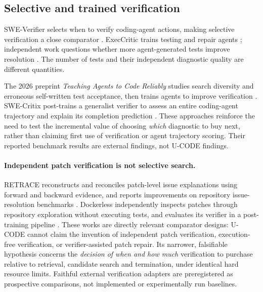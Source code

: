 \documentclass[pdflatex,sn-basic]{sn-jnl}
\begin{document}
\subsection{Selective and trained verification}
SWE-Verifier selects when to verify coding-agent actions, making
selective verification a close comparator \cite{zou2026sweverifier}.
ExecCritic trains testing and repair agents
\cite{tao2026execcritic}; independent work questions whether more
agent-generated tests improve resolution \cite{chen2026rethinktests}.
The number of tests and their independent diagnostic quality are
different quantities.

The 2026 preprint \emph{Teaching Agents to Code Reliably} studies
search diversity and erroneous self-written test acceptance, then
trains agents to improve verification \cite{mohsin2026teachingagents}.
SWE-Critix post-trains a generalist verifier to assess an entire
coding-agent trajectory and explain its completion prediction
\cite{hu2026swecritix}. These approaches reinforce the need
to test the incremental value of choosing \emph{which} diagnostic
to buy next, rather than claiming first use of verification or
agent trajectory scoring. Their reported benchmark results are
external findings, not U-CODE findings.

\paragraph{Independent patch verification is not selective search.}
RETRACE reconstructs and reconciles patch-level issue
explanations using forward and backward evidence, and
reports improvements on repository issue-resolution
benchmarks \cite{li2026retrace}. Dockerless independently
inspects patches through repository exploration without
executing tests, and evaluates its verifier in a
post-training pipeline \cite{zeng2026dockerless}.
These works are directly relevant comparator designs:
U-CODE cannot claim the invention of independent
patch verification, execution-free verification,
or verifier-assisted patch repair. Its narrower,
falsifiable hypothesis concerns the \emph{decision
of when and how much} verification to purchase
relative to retrieval, candidate search and
termination, under identical hard resource limits.
Faithful external verification adapters are
preregistered as prospective comparisons, not
implemented or experimentally run baselines.
\end{document}

